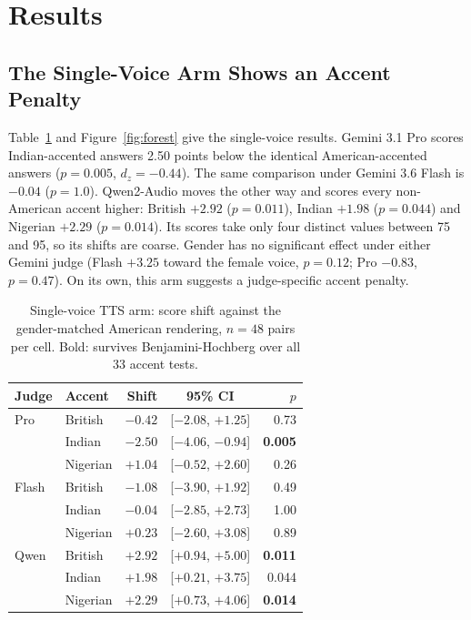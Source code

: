 \section{Results}
\label{sec:results}

\subsection{The Single-Voice Arm Shows an Accent Penalty}
\label{sec:singlevoice}

Table~\ref{tab:axisa} and Figure~\ref{fig:forest} give the single-voice results. Gemini 3.1 Pro scores Indian-accented answers 2.50 points below the identical American-accented answers ($p=0.005$, $d_z=-0.44$). The same comparison under Gemini 3.6 Flash is $-0.04$ ($p=1.0$). Qwen2-Audio moves the other way and scores every non-American accent higher: British $+2.92$ ($p=0.011$), Indian $+1.98$ ($p=0.044$) and Nigerian $+2.29$ ($p=0.014$). Its scores take only four distinct values between 75 and 95, so its shifts are coarse. Gender has no significant effect under either Gemini judge (Flash $+3.25$ toward the female voice, $p=0.12$; Pro $-0.83$, $p=0.47$). On its own, this arm suggests a judge-specific accent penalty.

\begin{table}[t]
\small
\centering
\setlength{\tabcolsep}{4pt}
\begin{tabular}{llrcr}
\toprule
Judge & Accent & Shift & 95\% CI & $p$ \\
\midrule
Pro & British & $-0.42$ & [$-2.08$, $+1.25$] & 0.73 \\
 & Indian & $\mathbf{-2.50}$ & [$-4.06$, $-0.94$] & \textbf{0.005} \\
 & Nigerian & $+1.04$ & [$-0.52$, $+2.60$] & 0.26 \\
\midrule
Flash & British & $-1.08$ & [$-3.90$, $+1.92$] & 0.49 \\
 & Indian & $-0.04$ & [$-2.85$, $+2.73$] & 1.00 \\
 & Nigerian & $+0.23$ & [$-2.60$, $+3.08$] & 0.89 \\
\midrule
Qwen & British & $\mathbf{+2.92}$ & [$+0.94$, $+5.00$] & \textbf{0.011} \\
 & Indian & $+1.98$ & [$+0.21$, $+3.75$] & 0.044 \\
 & Nigerian & $\mathbf{+2.29}$ & [$+0.73$, $+4.06$] & \textbf{0.014} \\
\bottomrule
\end{tabular}
\caption{Single-voice TTS arm: score shift against the gender-matched American rendering, $n=48$ pairs per cell. Bold: survives Benjamini-Hochberg over all 33 accent tests.}
\label{tab:axisa}
\end{table}

